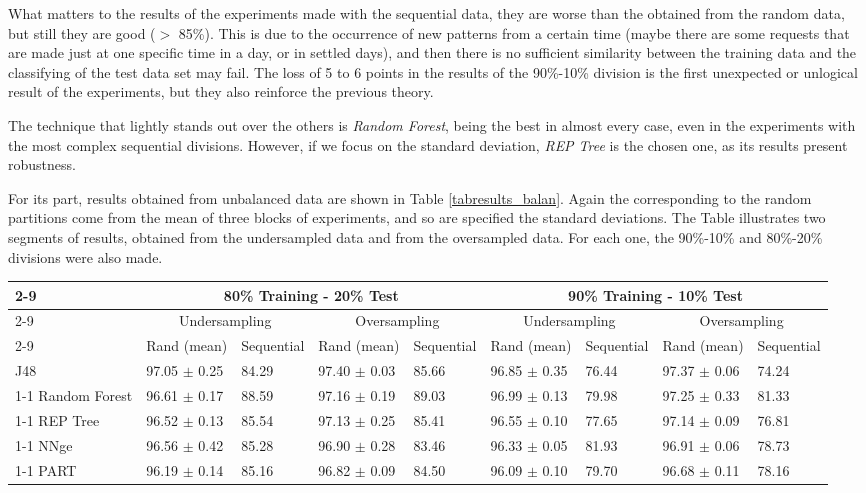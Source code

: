 \documentclass{llncs}
\begin{document}
What matters to the results of the experiments made with the sequential data, they are worse than the obtained from the random data, but still they are good ($>$ 85\%). This is due to the occurrence of new patterns from a certain time (maybe there are some requests that are made just at one specific time in a day, or in settled days), and then there is no sufficient similarity between the training data and the classifying of the test data set may fail. The loss of 5 to 6 points in the results of the 90\%-10\% division is the first unexpected or unlogical result of the experiments, but they also reinforce the previous theory.

The technique that lightly stands out over the others is
\textit{Random Forest}, being the best in almost every case, even in
the experiments with the most complex sequential divisions. However,
if we focus on the standard deviation, \textit{REP Tree} is the chosen
one, as its results present robustness. 

For its part, results obtained from unbalanced data are shown in Table \ref{tabresults_balan}. Again the corresponding to the random partitions come from the mean of three blocks of experiments, and so are specified the standard deviations. The Table illustrates two segments of results, obtained from the undersampled data and from the oversampled data. For each one, the 90\%-10\% and 80\%-20\% divisions were also made.

\begin{table*}[htpb]
\centering
 \caption{\label{tabresults_balan} Percentage of correctly classified patterns for balanced data (under- and oversampling)}
{\small
\begin{tabular}{|l|l|l|l|l|l|l|l|l|}
\cline{2-9}
\multicolumn{1}{l|}{} & \multicolumn{4}{c|}{80\% Training - 20\% Test} & \multicolumn{4}{c|}{90\% Training - 10\% Test} \\ 
\cline{2-9}
\multicolumn{1}{l|}{} & \multicolumn{2}{c|}{Undersampling} & \multicolumn{2}{c|}{Oversampling} & \multicolumn{2}{c|}{Undersampling} & \multicolumn{2}{c|}{Oversampling} \\ 
\cline{2-9}
\multicolumn{1}{l|}{} & Rand (mean) & Sequential & Rand (mean) & Sequential & Rand (mean) & Sequential & Rand (mean) & Sequential \\ 
\hline
J48 & 97.05 $\pm$ 0.25 & 84.29 & 97.40 $\pm$ 0.03 & 85.66 & 96.85 $\pm$ 0.35 & 76.44 & 97.37 $\pm$ 0.06 & 74.24 \\ 
\cline{1-1}
Random Forest & 96.61 $\pm$ 0.17 & 88.59 & 97.16 $\pm$ 0.19 & 89.03 & 96.99 $\pm$ 0.13 & 79.98 & 97.25 $\pm$ 0.33 & 81.33 \\ 
\cline{1-1}
REP Tree & 96.52 $\pm$ 0.13 & 85.54 & 97.13 $\pm$ 0.25 & 85.41 & 96.55 $\pm$ 0.10 & 77.65 & 97.14 $\pm$ 0.09 & 76.81 \\ 
\cline{1-1}
NNge & 96.56 $\pm$ 0.42 & 85.28 & 96.90 $\pm$ 0.28 & 83.46 & 96.33 $\pm$ 0.05 & 81.93 & 96.91 $\pm$ 0.06 & 78.73 \\ 
\cline{1-1}
PART & 96.19 $\pm$ 0.14 & 85.16 & 96.82 $\pm$ 0.09 & 84.50 & 96.09 $\pm$ 0.10 & 79.70 & 96.68 $\pm$ 0.11 & 78.16 \\ 
\hline
\end{tabular}
}
\end{table*}
\end{document}
